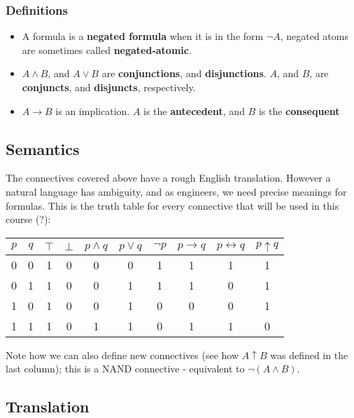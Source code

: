 \documentclass[a4paper, 12pt]{article}
\begin{document}
        \subsubsection*{Definitions}
        \begin{itemize}
            \item A formula is a \textbf{negated formula} when it is in the form $\neg A$, negated atoms are sometimes called \textbf{negated-atomic}.
            \item $A \land B$, and $A \lor B$ are \textbf{conjunctions}, and \textbf{disjunctions}. $A$, and $B$, are \textbf{conjuncts}, and \textbf{disjuncts}, respectively.
            \item $A \rightarrow B$ is an implication. $A$ is the \textbf{antecedent}, and $B$ is the \textbf{consequent}
        \end{itemize}
        \subsection*{Semantics}
        The connectives covered above have a rough English translation. However a natural language has ambiguity, and as engineers, we need precise meanings for formulas. This is the truth table for every connective that will be used in this course (?):
        \begin{center}
            \begin{tabular}{||c|c||c|c|c|c|c|c|c||c||}
                \hline
                $p$ & $q$ & $\top$ & $\bot$ & $p \land q$ & $p \lor q$ & $\neg p$ & $p \rightarrow q$ & $p \leftrightarrow q$ & $p \uparrow q$ \\
                \hline
                0 & 0 & 1 & 0 & 0 & 0 & 1 & 1 & 1 & 1\\
                0 & 1 & 1 & 0 & 0 & 1 & 1 & 1 & 0 & 1\\
                1 & 0 & 1 & 0 & 0 & 1 & 0 & 0 & 0 & 1\\
                1 & 1 & 1 & 0 & 1 & 1 & 0 & 1 & 1 & 0\\
                \hline
            \end{tabular}
        \end{center}
        Note how we can also define new connectives (see how $A \uparrow B$ was defined in the last column); this is a NAND connective - equivalent to $\neg (A \land B)$.
        \subsection*{Translation}
\end{document}
